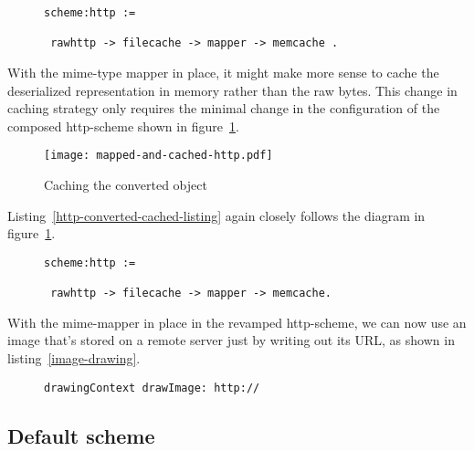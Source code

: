 \documentclass[preprint,authoryear]{acm_proc_article-sp}
\begin{document}
\begin{figure}[htbp]
\begin{lstlisting}[style=L,label=http-cached-converted-listing,caption=Converting and caching.]
scheme:http := 

 rawhttp -> filecache -> mapper -> memcache .
\end{lstlisting}
\end{figure}


With the mime-type mapper in place, it might make more sense to
cache the deserialized representation in memory rather than
the raw bytes.  This change in caching strategy only requires
the minimal change in the configuration of the composed http-scheme
shown in figure~\ref{http-converted-cached}.

\begin{figure}[htbp]
\caption{Caching the converted object}
\label{http-converted-cached}
\begin{center}
\texttt{[image: mapped-and-cached-http.pdf]}
\end{center}
\end{figure}

Listing~\ref{http-converted-cached-listing} again closely follows the
diagram in figure~\ref{http-converted-cached}.

\begin{figure}[htbp]
\begin{lstlisting}[style=L,label=http-converted-cached-listing,caption=Converting and caching.]
scheme:http := 

 rawhttp -> filecache -> mapper -> memcache.
\end{lstlisting}
\end{figure}

With the mime-mapper in place in the revamped http-scheme, we can now use 
an image that's stored on a remote server just by writing out its URL, as shown
in listing~\ref{image-drawing}.

\begin{figure}[htbp]
\begin{lstlisting}[style=L,label=image-drawing,caption=Drawing a remote image.]
drawingContext drawImage: http://
\end{lstlisting}
\end{figure}



\subsection{Default scheme}
\end{document}
